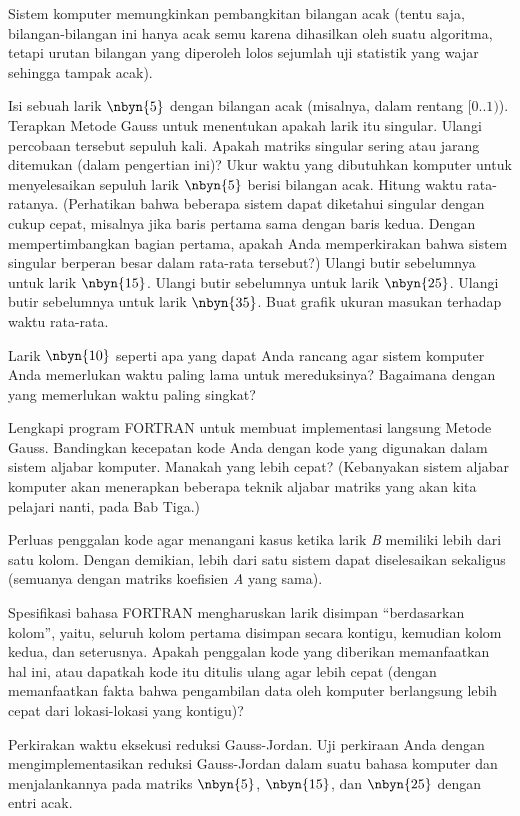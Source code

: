 \begin{exercises}
  \item Sistem komputer memungkinkan pembangkitan bilangan acak
    (tentu saja, bilangan-bilangan ini hanya acak semu karena dihasilkan
    oleh suatu algoritma, tetapi urutan bilangan yang diperoleh lolos
    sejumlah uji statistik yang wajar sehingga tampak acak).
    \begin{exparts}
      \partsitem Isi sebuah larik $\nbyn{5}$ dengan bilangan acak (misalnya,
        dalam rentang $[0..1)$).
        Terapkan Metode Gauss untuk menentukan apakah larik itu singular.
        Ulangi percobaan tersebut sepuluh kali.
        Apakah matriks singular sering atau jarang ditemukan (dalam pengertian
        ini)?
      \partsitem Ukur waktu yang dibutuhkan komputer untuk menyelesaikan
        sepuluh larik $\nbyn{5}$ berisi bilangan acak.
        Hitung waktu rata-ratanya.
        (Perhatikan bahwa beberapa sistem dapat diketahui singular dengan
        cukup cepat, misalnya jika baris pertama sama dengan baris kedua.
        Dengan mempertimbangkan bagian pertama, apakah Anda memperkirakan
        bahwa sistem singular berperan besar dalam rata-rata tersebut?)
      \partsitem Ulangi butir sebelumnya untuk larik $\nbyn{15}$.
      \partsitem Ulangi butir sebelumnya untuk larik $\nbyn{25}$.
      \partsitem Ulangi butir sebelumnya untuk larik $\nbyn{35}$.
      \partsitem Buat grafik ukuran masukan terhadap waktu rata-rata.
    \end{exparts}
  \item Larik $\nbyn{10}$ seperti apa yang dapat Anda rancang agar sistem
    komputer Anda memerlukan waktu paling lama untuk mereduksinya?
    Bagaimana dengan yang memerlukan waktu paling singkat?
  \item Lengkapi program FORTRAN untuk membuat implementasi langsung Metode
    Gauss.
    Bandingkan kecepatan kode Anda dengan kode yang digunakan dalam sistem
    aljabar komputer.
    Manakah yang lebih cepat?
    (Kebanyakan sistem aljabar komputer akan menerapkan beberapa teknik
    aljabar matriks yang akan kita pelajari nanti, pada Bab Tiga.)
  \item Perluas penggalan kode agar menangani kasus ketika larik \textit{B}
    memiliki lebih dari satu kolom.
    Dengan demikian, lebih dari satu sistem dapat diselesaikan sekaligus
    (semuanya dengan matriks koefisien \textit{A} yang sama).
  \item Spesifikasi bahasa FORTRAN mengharuskan larik disimpan ``berdasarkan
    kolom'', yaitu, seluruh kolom pertama disimpan secara kontigu, kemudian
    kolom kedua, dan seterusnya.
    Apakah penggalan kode yang diberikan memanfaatkan hal ini,
    atau dapatkah kode itu ditulis ulang agar lebih cepat (dengan memanfaatkan
    fakta bahwa pengambilan data oleh komputer berlangsung lebih cepat dari
    lokasi-lokasi yang kontigu)?
  \item Perkirakan waktu eksekusi reduksi Gauss-Jordan.
    Uji perkiraan Anda dengan mengimplementasikan reduksi Gauss-Jordan
    dalam suatu bahasa komputer dan menjalankannya pada matriks $\nbyn{5}$,
    $\nbyn{15}$, dan $\nbyn{25}$ dengan entri acak.
\end{exercises}
\endinput
